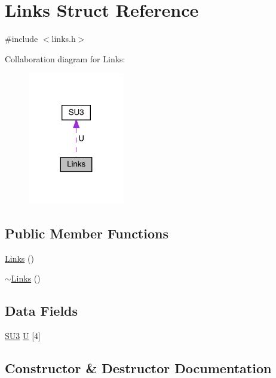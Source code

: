 \hypertarget{struct_links}{}\section{Links Struct Reference}
\label{struct_links}


{\ttfamily \#include $<$links.\+h$>$}



Collaboration diagram for Links\+:\nopagebreak
\begin{figure}[H]
\begin{center}
\leavevmode
\includegraphics[width=119pt]{struct_links__coll__graph}
\end{center}
\end{figure}
\subsection*{Public Member Functions}
\begin{DoxyCompactItemize}
\item 
\mbox{\hyperlink{struct_links_af94caa8fbd720bcb146b5fe25faf8d81}{Links}} ()
\item 
\mbox{\hyperlink{struct_links_a188a8ccdc7df378264d24ee5b406e0af}{$\sim$\+Links}} ()
\end{DoxyCompactItemize}
\subsection*{Data Fields}
\begin{DoxyCompactItemize}
\item 
\mbox{\hyperlink{class_s_u3}{S\+U3}} \mbox{\hyperlink{struct_links_a6a8574ec1ab055c455104e6c92b2f603}{U}} \mbox{[}4\mbox{]}
\end{DoxyCompactItemize}


\subsection{Constructor \& Destructor Documentation}
\mbox{\label{struct_links_af94caa8fbd720bcb146b5fe25faf8d81}} 
